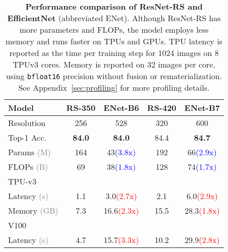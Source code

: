 \documentclass{article}
\begin{document}
\begin{table}[t!]
\begin{center}
\small
\begin{tabular}{l|cc|cc}
  \toprule
  \rowcolor{gray!15}
  \textbf{Model} & \textbf{RS-350} & \textbf{ENet-B6} & \textbf{RS-420} & \textbf{ENet-B7} \\
  \midrule
  Resolution & 256 & 528 & 320 & 600 \\
  \midrule
  \rowcolor{gray!15}
  Top-1 Acc. & \textbf{84.0} & \textbf{84.0} & 84.4 & \textbf{84.7} \\
  \midrule
  Params \textcolor{gray}{(M)} & 164 & 43\;\textcolor{blue}{\scriptsize{(3.8x)}} & 192 & 66\;\textcolor{blue}{\scriptsize{(2.9x)}} \\
  FLOPs \textcolor{gray}{(B)} & 69 & 38\;\textcolor{blue}{\scriptsize{(1.8x)}} & 128 & 74\;\textcolor{blue}{\scriptsize{(1.7x)}} \\
  \midrule
  \rowcolor{gray!15}
  TPU-v3 & & & & \\
  \;\;Latency \textcolor{gray}{(s)} & 1.1 & 3.0\;\textcolor{red}{\scriptsize{(2.7x)}} & 2.1 & 6.0\;\textcolor{red}{\scriptsize{(2.9x)}} \\
  \;\;Memory \textcolor{gray}{(GB)} & 7.3 & 16.6\;\textcolor{red}{\scriptsize{(2.3x)}} & 15.5 & 28.3\;\textcolor{red}{\scriptsize{(1.8x)}} \\
  \midrule
  \rowcolor{gray!15}
  V100  & & & & \\
  \;\;Latency \textcolor{gray}{(s)} & 4.7 & 15.7\;\textcolor{red}{\scriptsize{(3.3x)}} & 10.2 & 29.9\;\textcolor{red}{\scriptsize{(2.8x)}} \\
  \bottomrule
\end{tabular}
\end{center}
\vspace{-0.2cm}
\caption{\textbf{Performance comparison of ResNet-RS and EfficientNet} (abbreviated ENet). Although ResNet-RS has more parameters and FLOPs, the model employs less memory and runs faster on TPUs and GPUs. TPU latency is reported as the time per training step for 1024 images on 8 TPUv3 cores. Memory is reported on 32 images per core, using \texttt{bfloat16} precision without fusion or rematerialization. See Appendix~\ref{sec:profiling} for more profiling details.}
\label{tab:mem_and_flops_comp}
\end{table}
\end{document}
